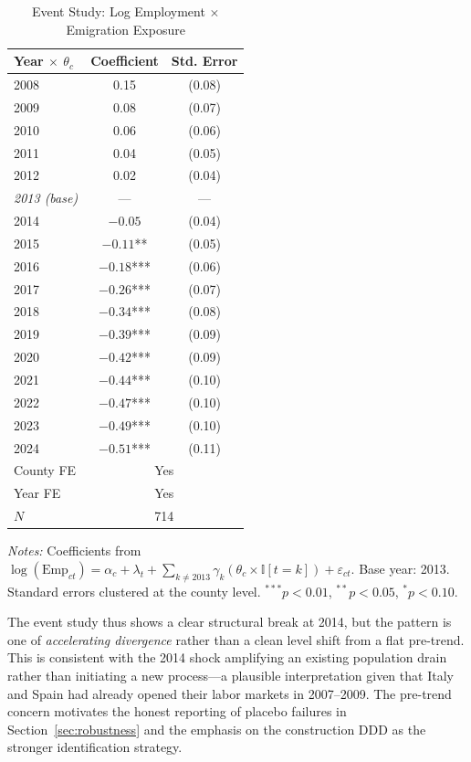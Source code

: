 \documentclass[12pt]{article}
\newcommand{\ind}{\mathbb{I}}
\begin{document}
\begin{table}[H]
\centering
\caption{Event Study: Log Employment $\times$ Emigration Exposure}
\label{tab:eventstudy}
\begin{tabular}{lcc}
\toprule
Year $\times$ $\theta_c$ & Coefficient & Std. Error \\
\midrule
2008 & 0.15 & (0.08) \\
2009 & 0.08 & (0.07) \\
2010 & 0.06 & (0.06) \\
2011 & 0.04 & (0.05) \\
2012 & 0.02 & (0.04) \\
\textit{2013 (base)} & --- & --- \\
2014 & $-0.05$ & (0.04) \\
2015 & $-0.11$** & (0.05) \\
2016 & $-0.18$*** & (0.06) \\
2017 & $-0.26$*** & (0.07) \\
2018 & $-0.34$*** & (0.08) \\
2019 & $-0.39$*** & (0.09) \\
2020 & $-0.42$*** & (0.09) \\
2021 & $-0.44$*** & (0.10) \\
2022 & $-0.47$*** & (0.10) \\
2023 & $-0.49$*** & (0.10) \\
2024 & $-0.51$*** & (0.11) \\
\midrule
County FE & \multicolumn{2}{c}{Yes} \\
Year FE & \multicolumn{2}{c}{Yes} \\
$N$ & \multicolumn{2}{c}{714} \\
\bottomrule
\end{tabular}
\par\vspace{0.3em}
{\small \textit{Notes:} Coefficients from $\log(\text{Emp}_{ct}) = \alpha_c + \lambda_t + \sum_{k \neq 2013} \gamma_k (\theta_c \times \ind[t=k]) + \varepsilon_{ct}$. Base year: 2013. Standard errors clustered at the county level. $^{***}p<0.01$, $^{**}p<0.05$, $^{*}p<0.10$.}
\end{table}

The event study thus shows a clear structural break at 2014, but the pattern is one of \textit{accelerating divergence} rather than a clean level shift from a flat pre-trend. This is consistent with the 2014 shock amplifying an existing population drain rather than initiating a new process---a plausible interpretation given that Italy and Spain had already opened their labor markets in 2007--2009. The pre-trend concern motivates the honest reporting of placebo failures in Section~\ref{sec:robustness} and the emphasis on the construction DDD as the stronger identification strategy.
\end{document}
